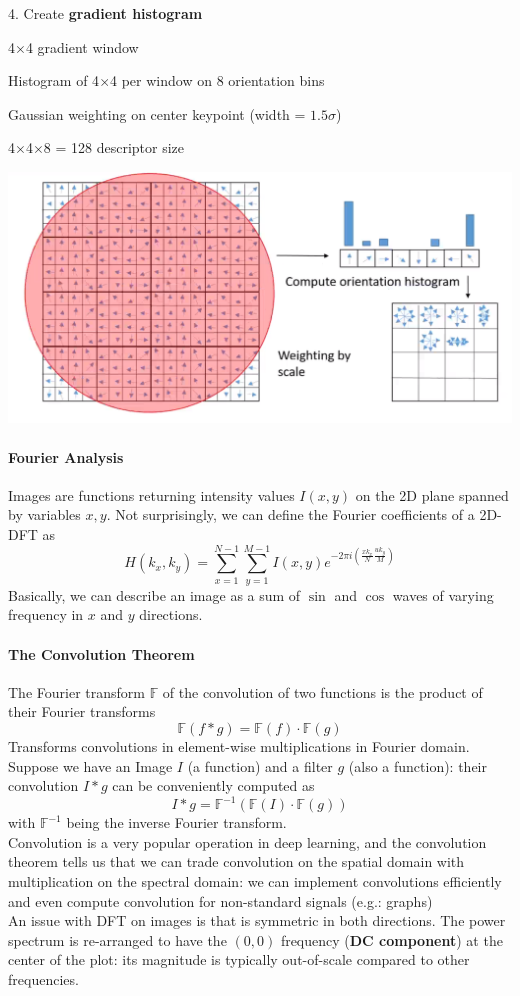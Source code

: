 \documentclass[10pt]{report}
\begin{document}
\begin{list}{}{}
	\item[4.] Create \textbf{gradient histogram}\begin{list}{}{}
		\item 4$\times$4 gradient window
		\item Histogram of 4$\times$4 per window on 8 orientation bins
		\item Gaussian weighting on center keypoint (width = $1.5\sigma$)
		\item 4$\times$4$\times$8 = 128 descriptor size
	\end{list}
\end{list}
\begin{center}
	\includegraphics[scale=0.33]{3.png}
\end{center}
\paragraph{Fourier Analysis} Images are functions returning intensity values $I(x,y)$ on the 2D plane spanned by variables $x,y$. Not surprisingly, we can define the Fourier coefficients of a 2D-DFT as
$$H(k_x,k_y)=\sum_{x=1}^{N-1}\sum_{y=1}^{M-1}I(x,y)e^{-2\pi i\left(\frac{xk_x}{N}\frac{uk_y}{M}\right)}$$
Basically, we can describe an image as a sum of $\sin$ and $\cos$ waves of varying frequency in $x$ and $y$ directions.
\paragraph{The Convolution Theorem} The Fourier transform $\mathbb{F}$ of the convolution of two functions is the product of their Fourier transforms
$$\mathbb{F}(f*g)=\mathbb{F}(f)\cdot\mathbb{F}(g)$$
Transforms convolutions in element-wise multiplications in Fourier domain. Suppose we have an Image $I$ (a function) and a filter $g$ (also a function): their convolution $I*g$ can be conveniently computed as
$$I*g = \mathbb{F}^{-1}(\mathbb{F}(I)\cdot\mathbb{F}(g))$$
with $\mathbb{F}^{-1}$ being the inverse Fourier transform.\\
Convolution is a very popular operation in deep learning, and the convolution theorem tells us that we can trade convolution on the spatial domain with multiplication on the spectral domain: we can implement convolutions efficiently and even compute convolution for non-standard signals (e.g.: graphs)\\
An issue with DFT on images is that is symmetric in both directions. The power spectrum is re-arranged to have the $(0,0)$ frequency (\textbf{DC component}) at the center of the plot: its magnitude is typically out-of-scale compared to other frequencies.
\end{document}
